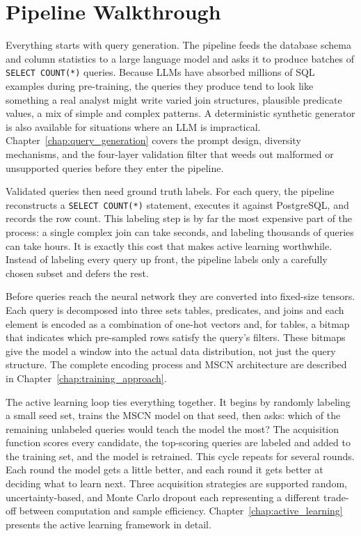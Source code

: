 \section{Pipeline Walkthrough}

Everything starts with query generation. The pipeline feeds the database schema and column statistics to a large language model and asks it to produce batches of \texttt{SELECT COUNT(*)} queries. Because LLMs have absorbed millions of SQL examples during pre-training, the queries they produce tend to look like something a real analyst might write varied join structures, plausible predicate values, a mix of simple and complex patterns. A deterministic synthetic generator is also available for situations where an LLM is impractical. Chapter~\ref{chap:query_generation} covers the prompt design, diversity mechanisms, and the four-layer validation filter that weeds out malformed or unsupported queries before they enter the pipeline.

Validated queries then need ground truth labels. For each query, the pipeline reconstructs a \texttt{SELECT COUNT(*)} statement, executes it against PostgreSQL, and records the row count. This labeling step is by far the most expensive part of the process: a single complex join can take seconds, and labeling thousands of queries can take hours. It is exactly this cost that makes active learning worthwhile. Instead of labeling every query up front, the pipeline labels only a carefully chosen subset and defers the rest.

Before queries reach the neural network they are converted into fixed-size tensors. Each query is decomposed into three sets tables, predicates, and joins and each element is encoded as a combination of one-hot vectors and, for tables, a bitmap that indicates which pre-sampled rows satisfy the query's filters. These bitmaps give the model a window into the actual data distribution, not just the query structure. The complete encoding process and MSCN architecture are described in Chapter~\ref{chap:training_approach}.

The active learning loop ties everything together. It begins by randomly labeling a small seed set, trains the MSCN model on that seed, then asks: which of the remaining unlabeled queries would teach the model the most? The acquisition function scores every candidate, the top-scoring queries are labeled and added to the training set, and the model is retrained. This cycle repeats for several rounds. Each round the model gets a little better, and each round it gets better at deciding what to learn next. Three acquisition strategies are supported random, uncertainty-based, and Monte Carlo dropout each representing a different trade-off between computation and sample efficiency. Chapter~\ref{chap:active_learning} presents the active learning framework in detail.

